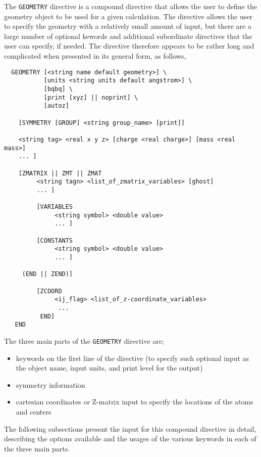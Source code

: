 \label{sec:geom}

The \verb+GEOMETRY+ directive is a compound directive that allows the
user to define the geometry object to be used for a given calculation.
The directive allows the user to specify the geometry 
with a relatively small amount of input, but there are a large number of
optional kewords and additional subordinate directives that the user can
specify, if needed.  The directive therefore appears to be rather
long and complicated when presented in its general form, as follows,
\begin{verbatim}
  GEOMETRY [<string name default geometry>] \
           [units <string units default angstrom>] \
           [bqbq] \
           [print [xyz] || noprint] \
           [autoz]
    
    [SYMMETRY [GROUP] <string group_name> [print]]

    <string tag> <real x y z> [charge <real charge>] [mass <real mass>]
    ... ]

    [ZMATRIX || ZMT || ZMAT
         <string tagn> <list_of_zmatrix_variables> [ghost]
         ... ]

         [VARIABLES
              <string symbol> <double value>
              ... ]
 
         [CONSTANTS
              <string symbol> <double value>
              ... ]

     (END || ZEND)]

         [ZCOORD
              <ij_flag> <list_of_z-coordinate_variables>
               ...
          END]
   END
\end{verbatim}

The three main parts of the \verb+GEOMETRY+ directive
are;

\begin{itemize}
\item keywords on the first line of the directive (to specify such optional
input as the object name, input units, and print level for the output)
\item symmetry information
\item cartesian coordinates or Z-matrix input to specify the locations 
of the atoms and centers
\end{itemize}

The following subsections present the input for this compound directive in
detail, describing the options available and the usages of the various
keywords in each of the three main parts.


